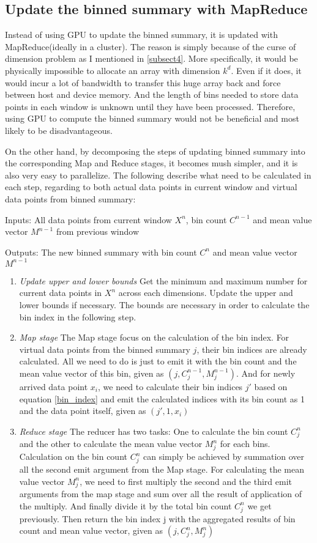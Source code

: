 \documentclass[11pt]{article}       %
\begin{document}
\subsection{Update the binned summary with MapReduce}

Instead of using GPU to update the binned summary, it is updated with MapReduce(ideally in a cluster). The reason is simply because of the curse of dimension problem as I mentioned in \ref{subsect4}. More specifically, it would be physically impossible to allocate an array with dimension $k^d$. Even if it does, it would incur a lot of bandwidth to transfer this huge array back and force between host and device memory.  And the length of bins needed to store data points in each window is unknown until they have been processed. Therefore, using GPU to compute the binned summary would not be beneficial and most likely to be disadvantageous. 

On the other hand, by decomposing the steps of updating binned summary into the corresponding Map and Reduce stages, it becomes mush simpler, and it is also very easy to parallelize. The following describe what need to be calculated in each step, regarding to both actual data points in current window and virtual data points from binned summary:

Inputs: All data points from current window $X^n$, bin count $C^{n-1}$ and mean value vector $M^{n-1}$ from previous window

Outputs: The new binned summary with bin count $C^{n}$ and mean value vector $M^{n-1}$

\begin{enumerate}
 \item {\textit{Update upper and lower bounds}}
 	Get the minimum and maximum number for current data points in $X^n$ across each dimensions. Update the upper and lower bounds if necessary. The bounds are necessary in order to calculate the bin index in the following step.
 \item {\textit{Map stage}}
 	The Map stage focus on the calculation of the bin index. For virtual data points from the binned summary $j$, their bin indices are already calculated. All we need to do is just to emit it with the bin count and the mean value vector of this bin, given as $(j, C_j^{n-1}, M_j^{n-1})$. And for newly arrived data point $x_i$, we need to calculate their bin indices $j'$ based on equation \ref{bin_index} and emit the calculated indices with its bin count as 1 and the data point itself, given as ${(j', 1, x_i)}$
\item {\textit{Reduce stage}}
	The reducer has two tasks: One to calculate the bin count $C_j^n$ and the other to calculate the mean value vector $M_j^n$ for each bins. Calculation on the bin count $C_j^n$ can simply be achieved by summation over all the second emit argument from the Map stage. For calculating the mean value vector $M_j^n$, we need to first multiply the second and the third emit arguments from the map stage and sum over all the result of application of the multiply. And finally divide it by the total bin count $C_j^n$ we get previously. Then return the bin index j with the aggregated results of bin count and mean value vector, given as $(j, C_j^n, M_j^{n})$
\end{enumerate}
\end{document}
